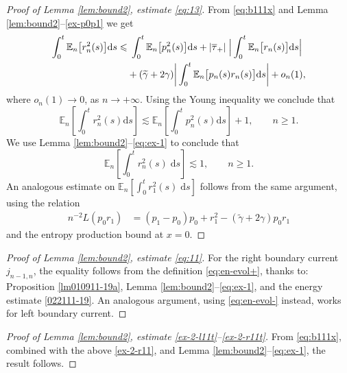 \documentclass[EJP]{ejpecp} %
\newcommand\E{{\mathbb E}}
\renewcommand{\ge}{\geqslant}
\renewcommand{\le}{\leqslant}
\newcommand{\dd  }{\mathrm{d}}
\renewcommand{\tilde}{\widetilde}
\renewcommand{\bar}{\overline}
\numberwithin{equation}{section}
\begin{document}
\begin{proof}[Proof of Lemma \ref{lem:bound2}, estimate \eqref{eq:13}]
From \eqref{eq:b111x} and Lemma \ref{lem:bound2}--\eqref{ex-p0p1} we get
\begin{align}
\label{eq:b111d}
  \int_0^t \E_n \big[ r_n^2(s)\big] \dd s  \le  & \; \int_0^t \E_n
 \big[ p_n^2(s)\big]\dd s+|\bar\tau_+|\; \Big|\int_0^t \E_n  \big[r_n(s)\big] \dd s \Big| \notag\\
& + (\tilde\gamma +2\gamma)
 \bigg| \int_0^t \E_n  \big[ p_n(s) r_n(s)\big] \dd s\bigg| +o_n(1),
  \end{align}
where $o_n(1)\rightarrow0$, as $n\to+\infty$. Using the Young inequality we 
   conclude that 
  \begin{equation}\label{eq:rn-21}
  \mathbb{E}_n\left[ \int_0^t r_n^2(s)\dd s\right]  \lesssim
  \mathbb{E}_n\left[ \int_0^t p_n^2(s)\dd s\right] +1,\qquad
  n\ge 1.
\end{equation} 
We use Lemma \ref{lem:bound2}--\eqref{eq:ex-1} to conclude that
$$
\mathbb{E}_n\left[ \int_0^t r_n^2(s) \;
      \dd s\right] \lesssim 1,\qquad n\ge1.
$$
An analogous  estimate on $\mathbb{E}_n\left[ \int_0^t r_1^2(s) \;
      \dd s\right] $ follows from the same argument, using the relation
\begin{align}
     n^{-2}L(p_0 r_1) &= (p_1-p_0)p_0+  r_1^2 - (\tilde\gamma +2\gamma)
    p_0r_1\label{eq:a}
  \end{align}
and the entropy production bound at $x=0$.
\end{proof}


\begin{proof}[Proof of Lemma \ref{lem:bound2}, estimate \eqref{eq:11}]
For the right boundary current $j_{n-1,n}$, the equality follows from the definition
\eqref{eq:en-evol+}, thanks to: Proposition \ref{lm010911-19a}, Lemma \ref{lem:bound2}--\eqref{eq:ex-1}, and the energy estimate \eqref{022111-19}.  An analogous argument, using \eqref{eq:en-evol-} instead, works for
left boundary current.  
\end{proof}
 

\begin{proof}[Proof of Lemma \ref{lem:bound2}, estimate \eqref{ex-2-l11t}--\eqref{ex-2-r11t}] 
From \eqref{eq:b111x}, combined with the above \eqref{ex-2-r11}, and Lemma \ref{lem:bound2}--\eqref{eq:ex-1}, the result follows.
\end{proof}
\end{document}

